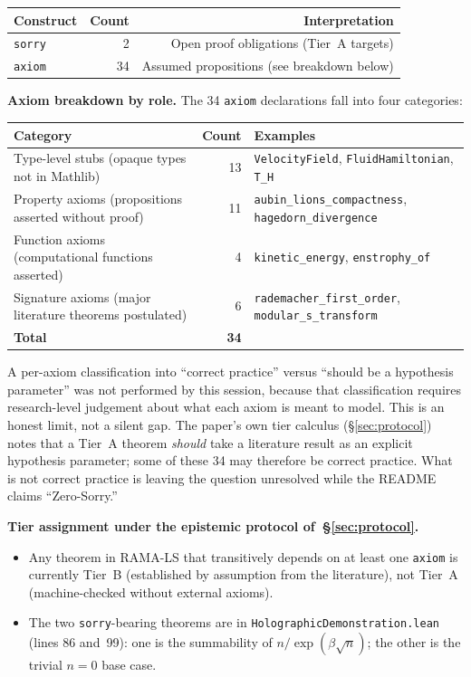 \begin{center}
\begin{tabular}{lrr}
\toprule
\textbf{Construct} & \textbf{Count} & \textbf{Interpretation} \\
\midrule
\texttt{sorry}  & 2  & Open proof obligations (Tier~A targets) \\
\texttt{axiom}  & 34 & Assumed propositions (see breakdown below) \\
\bottomrule
\end{tabular}
\end{center}

\noindent
\textbf{Axiom breakdown by role.}
The 34 \texttt{axiom} declarations fall into four categories:

\begin{center}
\begin{tabular}{lrl}
\toprule
\textbf{Category} & \textbf{Count} & \textbf{Examples} \\
\midrule
Type-level stubs (opaque types not in Mathlib) & 13 &
  \texttt{VelocityField}, \texttt{FluidHamiltonian}, \texttt{T\_H} \\
Property axioms (propositions asserted without proof) & 11 &
  \texttt{aubin\_lions\_compactness}, \texttt{hagedorn\_divergence} \\
Function axioms (computational functions asserted) & 4 &
  \texttt{kinetic\_energy}, \texttt{enstrophy\_of} \\
Signature axioms (major literature theorems postulated) & 6 &
  \texttt{rademacher\_first\_order}, \texttt{modular\_s\_transform} \\
\midrule
\textbf{Total} & \textbf{34} & \\
\bottomrule
\end{tabular}
\end{center}

\noindent
A per-axiom classification into ``correct practice'' versus ``should be a
hypothesis parameter'' was not performed by this session, because that
classification requires research-level judgement about what each axiom is
meant to model.
This is an honest limit, not a silent gap.
The paper's own tier calculus (§\ref{sec:protocol}) notes that a Tier~A
theorem \emph{should} take a literature result as an explicit hypothesis
parameter; some of these 34 may therefore be correct practice.
What is not correct practice is leaving the question unresolved while the
README claims ``Zero-Sorry.''

\noindent
\textbf{Tier assignment under the epistemic protocol of~§\ref{sec:protocol}.}
\begin{itemize}
  \item Any theorem in RAMA-LS that transitively depends on at least one
    \texttt{axiom} is currently Tier~B (established by assumption from
    the literature), not Tier~A (machine-checked without external axioms).
  \item The two \texttt{sorry}-bearing theorems are in
    \texttt{HolographicDemonstration.lean} (lines 86 and~99):
    one is the summability of $n/\exp(\beta\sqrt{n})$;
    the other is the trivial $n=0$ base case.
\end{itemize}

